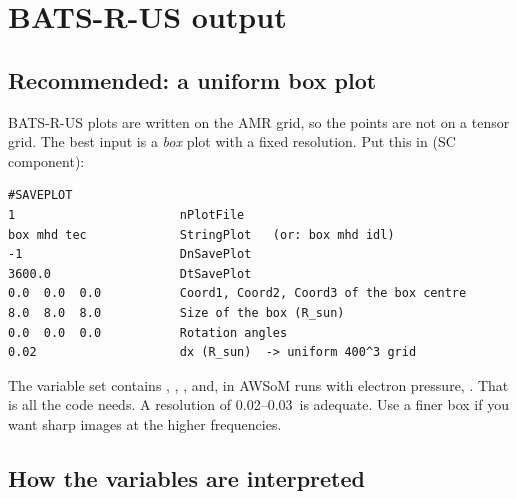 \section{BATS-R-US output}

\subsection*{Recommended: a uniform box plot}
BATS-R-US  plots are written on the AMR grid, so the points are not on a tensor
grid. The best input is a \emph{box} plot with a fixed resolution. Put this in
 (SC component):

\begin{lstlisting}
#SAVEPLOT
1                       nPlotFile
box mhd tec             StringPlot   (or: box mhd idl)
-1                      DnSavePlot
3600.0                  DtSavePlot
0.0  0.0  0.0           Coord1, Coord2, Coord3 of the box centre
8.0  8.0  8.0           Size of the box (R_sun)
0.0  0.0  0.0           Rotation angles
0.02                    dx (R_sun)  -> uniform 400^3 grid
\end{lstlisting}

The  variable set contains , , ,  and, in
AWSoM runs with electron pressure, . That is all the code needs. A resolution
of 0.02--0.03\,\rsun{} is adequate. Use a finer box if you want sharp images at the
higher frequencies.

\subsection*{How the variables are interpreted}

